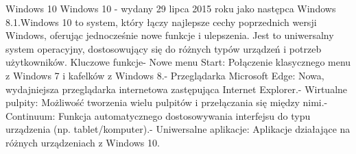 \begin{frame}{Windows 10}
Windows 10 - wydany 29 lipca 2015 roku jako następca Windows 8.1.Windows 10 to system, który łączy najlepsze cechy poprzednich wersji Windows, oferując jednocześnie nowe funkcje i ulepszenia. Jest to uniwersalny system operacyjny, dostosowujący się do różnych typów urządzeń i potrzeb użytkowników. Kluczowe funkcje- Nowe menu Start: Połączenie klasycznego menu z Windows 7 i kafelków z Windows 8.- Przeglądarka Microsoft Edge: Nowa, wydajniejsza przeglądarka internetowa zastępująca Internet Explorer.- Wirtualne pulpity: Możliwość tworzenia wielu pulpitów i przełączania się między nimi.- Continuum: Funkcja automatycznego dostosowywania interfejsu do typu urządzenia (np. tablet/komputer).- Uniwersalne aplikacje: Aplikacje działające na różnych urządzeniach z Windows 10.   



\end{frame}
